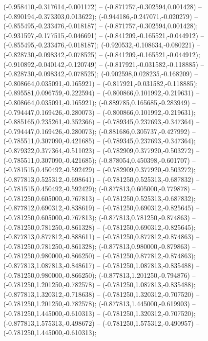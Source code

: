  (-0.958410,-0.317614,-0.001172) -- (-0.871757,-0.302594,0.001428) -- (-0.890194,-0.373303,0.013622);
 (-0.944186,-0.247071,-0.020279) -- (-0.855495,-0.233476,-0.018187) -- (-0.871757,-0.302594,0.001428);
 (-0.931597,-0.177515,-0.046691) -- (-0.841209,-0.165521,-0.044912) -- (-0.855495,-0.233476,-0.018187);
 (-0.920532,-0.108634,-0.080221) -- (-0.828730,-0.098342,-0.078525) -- (-0.841209,-0.165521,-0.044912);
 (-0.910892,-0.040142,-0.120749) -- (-0.817921,-0.031582,-0.118885) -- (-0.828730,-0.098342,-0.078525);
 (-0.902598,0.028235,-0.168209) -- (-0.808664,0.035091,-0.165921) -- (-0.817921,-0.031582,-0.118885);
 (-0.895581,0.096759,-0.222594) -- (-0.800866,0.101992,-0.219631) -- (-0.808664,0.035091,-0.165921);
 (-0.889785,0.165685,-0.283949) -- (-0.794447,0.169426,-0.280073) -- (-0.800866,0.101992,-0.219631);
 (-0.885165,0.235261,-0.352366) -- (-0.789345,0.237693,-0.347364) -- (-0.794447,0.169426,-0.280073);
 (-0.881686,0.305737,-0.427992) -- (-0.785511,0.307090,-0.421685) -- (-0.789345,0.237693,-0.347364);
 (-0.879322,0.377364,-0.511023) -- (-0.782909,0.377920,-0.503272) -- (-0.785511,0.307090,-0.421685);
 (-0.878054,0.450398,-0.601707) -- (-0.781515,0.450492,-0.592429) -- (-0.782909,0.377920,-0.503272);
 (-0.877813,0.525312,-0.698641) -- (-0.781250,0.525313,-0.687832) -- (-0.781515,0.450492,-0.592429);
 (-0.877813,0.605000,-0.779878) -- (-0.781250,0.605000,-0.767813) -- (-0.781250,0.525313,-0.687832);
 (-0.877812,0.690312,-0.838619) -- (-0.781250,0.690312,-0.825645) -- (-0.781250,0.605000,-0.767813);
 (-0.877813,0.781250,-0.874863) -- (-0.781250,0.781250,-0.861328) -- (-0.781250,0.690312,-0.825645);
 (-0.877813,0.877812,-0.888611) -- (-0.781250,0.877812,-0.874863) -- (-0.781250,0.781250,-0.861328);
 (-0.877813,0.980000,-0.879863) -- (-0.781250,0.980000,-0.866250) -- (-0.781250,0.877812,-0.874863);
 (-0.877813,1.087813,-0.848617) -- (-0.781250,1.087813,-0.835488) -- (-0.781250,0.980000,-0.866250);
 (-0.877813,1.201250,-0.794876) -- (-0.781250,1.201250,-0.782578) -- (-0.781250,1.087813,-0.835488);
 (-0.877813,1.320312,-0.718638) -- (-0.781250,1.320312,-0.707520) -- (-0.781250,1.201250,-0.782578);
 (-0.877813,1.445000,-0.619903) -- (-0.781250,1.445000,-0.610313) -- (-0.781250,1.320312,-0.707520);
 (-0.877813,1.575313,-0.498672) -- (-0.781250,1.575312,-0.490957) -- (-0.781250,1.445000,-0.610313);
